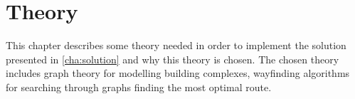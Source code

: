 \chapter{Theory}

This chapter describes some theory needed in order to implement the solution presented in \cref{cha:solution} and why this theory is chosen. The chosen theory includes graph theory for modelling building complexes, wayfinding algorithms for searching through graphs finding the most optimal route.



%

%
%


%

%